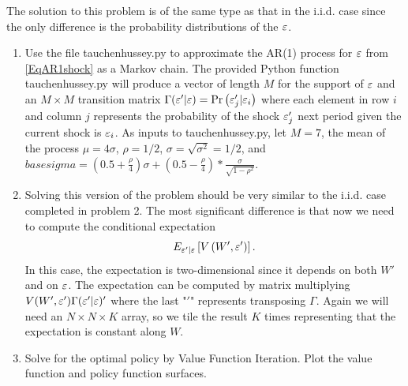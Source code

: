 The solution to this problem is of the same type as that in the i.i.d. case since the only difference is the probability distributions of the $\varepsilon$.

\begin{problem}
\begin{enumerate}
   \item Use the file tauchenhussey.py to approximate the AR(1) process for $\varepsilon$ from \eqref{EqAR1shock} as a Markov chain. The provided Python function tauchenhussey.py will produce a vector of length $M$ for the support of $\varepsilon$ and an $M\times M$ transition matrix $\Gamma(\varepsilon'|\varepsilon)=\text{Pr}\left(\varepsilon_j'|\varepsilon_i\right)$ where each element in row $i$ and column $j$ represents the probability of the shock $\varepsilon_j'$ next period given the current shock is $\varepsilon_i$. As inputs to tauchenhussey.py, let $M=7$, the mean of the process $\mu=4\sigma$, $\rho = 1/2$, $\sigma=\sqrt{\sigma^2}=1/2$, and $basesigma=(0.5+\frac{\rho}{4})\sigma + (0.5 - \frac{\rho}{4})*\frac{\sigma}{\sqrt{1-\rho^2}}$.

  \item Solving this version of the problem should be very similar to the i.i.d. case completed in problem 2.  The most significant difference is that now we need to compute the conditional expectation
      \begin{equation}
      E_{\varepsilon'|\varepsilon}\left[V\left(W',\varepsilon'\right)\right].
      \end{equation}
      In this case, the expectation is two-dimensional since it depends on both $W'$ and on $\varepsilon$.  The expectation can be computed by matrix multiplying $V(W',\varepsilon')\Gamma(\varepsilon' | \varepsilon)'$ where the last "$'$" represents transposing $\Gamma$.  Again we will need an $N\times N\times K$ array, so we tile the result $K$ times representing that the expectation is constant along $W$.

  \item Solve for the optimal policy by Value Function Iteration.  Plot the value function and policy function surfaces.


\end{enumerate}
\end{problem} 